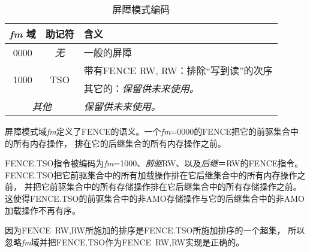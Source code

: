 \begin{table}[htp]
\begin{small}
\begin{center}
\begin{tabular}{|c|c|l|}
\hline
{\em fm} 域 & 助记符 & 含义 \\
\hline
0000 & \em 无 & 一般的屏障 \\
\hline
\multirow{2}{*}{1000} & \multirow{2}{*}{TSO} & 带有FENCE RW, RW：排除“写到读”的次序 \\
                      &                      & 其它的：\em 保留供未来使用。 \\
\hline
\multicolumn{2}{|c|}{\em 其他} & \em 保留供未来使用。 \\
\hline
\end{tabular}
\end{center}
\end{small}
\caption{屏障模式编码}
\label{fm}
\end{table}

屏障模式域{\em fm}定义了FENCE的语义。一个{\em fm}=0000的FENCE把它的前驱集合中的所有内存操作，
排在它的后继集合的所有内存操作之前。

FENCE.TSO指令被编码为{\em fm}=1000、{\em 前驱}RW、以及{\em 后继}＝RW的FENCE指令。
FENCE.TSO把它前驱集合中的所有加载操作排在它后继集合中的所有内存操作之前，
并把它前驱集合中的所有存储操作排在它后继集合中的所有存储操作之前。
这使得FENCE.TSO的前驱集合中的非AMO存储操作与它的后继集合中的非AMO加载操作不再有序。

\begin{commentary}
  因为\mbox{FENCE RW,RW}所施加的排序是FENCE.TSO所施加排序的一个超集，
  所以忽略{\em fm}域并把FENCE.TSO作为\mbox{FENCE RW,RW}实现是正确的。
\end{commentary}

